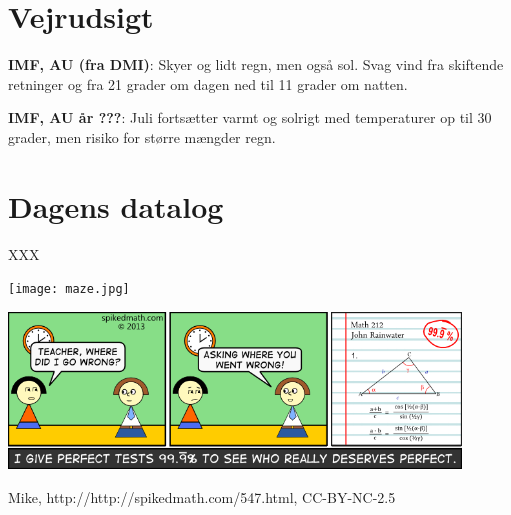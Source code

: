 \documentclass[article,10pt,a4,oneside]{memoir}
\begin{document}
\begin{minipage}[b]{0.95\textwidth}
\begin{minipage}[t]{0.47\textwidth}
\section*{Vejrudsigt}
\textbf{IMF, AU (fra DMI)}: Skyer og lidt regn, men også sol. Svag vind fra skiftende retninger og fra 21 grader om dagen ned til 11 grader om natten.

\textbf{IMF, AU år ???}: Juli fortsætter varmt og solrigt med temperaturer op til 30 grader, men risiko for større mængder regn.

\section*{Dagens datalog}
XXX
\begin{center}
\texttt{[image: maze.jpg]}
\end{center}
\end{minipage}

\includegraphics[width=0.9\textwidth]{547-the-perfect-score.png}
\begin{center}
\tiny Mike, http://http://spikedmath.com/547.html, CC-BY-NC-2.5
\end{center}
\end{minipage}
\end{document}
